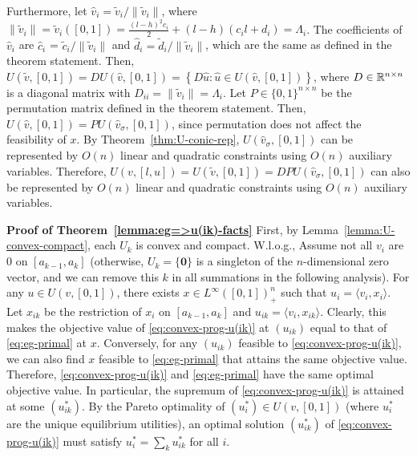 Furthermore, let $\hat{v}_i = \tilde{v}_i/\|\tilde{v}_i\|$, where $\|\tilde{v}_i\| = \tilde{v}_i([0,1]) =\frac{(l-h)^2c_i}{2} + (l-h)(c_i l + d_i) = \Lambda_i$. 
The coefficients of $\hat{v}_i$ are $\hat{c}_i$ = $\tilde{c}_i / \|\tilde{v}_i\|$ and $\hat{d}_i = \tilde{d}_i / \|\tilde{v}_i \|$, which are the same as defined in the theorem statement. Then,
$U(\tilde{v}, [0,1]) = D U(\hat{v},[0,1]) = \left\{D\hat{u}: \hat{u} \in U(\hat{v}, [0,1]) \right\}$,
where $D \in \mathbb{R}^{n\times n}$ is a diagonal matrix with $D_{ii} = \|\tilde{v}_i\| = \Lambda_i$. 
Let $P\in \{0,1\}^{n\times n}$ be the permutation matrix defined in the theorem statement. Then, 
$U(\hat{v}, [0,1]) = PU(\hat{v}_\sigma, [0,1])$,
since permutation does not affect the feasibility of $x$. By Theorem~\ref{thm:U-conic-rep}, $U(\hat{v}_\sigma, [0,1])$ can be represented by $O(n)$ linear and quadratic constraints using $O(n)$ auxiliary variables.
Therefore, 
$U(v, [l,u]) = U(\tilde{v}, [0,1]) = D P U(\hat{v}_\sigma, [0,1])$
can also be represented by $O(n)$ linear and quadratic constraints using $O(n)$ auxiliary variables. 

\smallskip\noindent\textbf{Proof of Theorem~\ref{lemma:eg=>u(ik)-facts}}
First, by Lemma~\ref{lemma:U-convex-compact}, each $U_k$ is convex and compact. W.l.o.g., Assume not all $v_i$ are $0$ on $[a_{k-1}, a_k]$ (otherwise, $U_k = \{\mathbf{0}\}$ is a singleton of the $n$-dimensional zero vector, and we can remove this $k$ in all summations in the following analysis).
For any $u\in U(v, [0,1])$, there exists $x\in L^\infty([0,1])_+^n$ such that $u_i = \langle v_i, x_i\rangle$.  Let $x_{ik}$ be the restriction of $x_i$ on $[a_{k-1}, a_k]$ and $u_{ik} = \langle v_i, x_{ik}\rangle$. 
Clearly, this makes the objective value of \eqref{eq:convex-prog-u(ik)} at $(u_{ik})$ equal to that of \eqref{eq:eg-primal} at $x$. Conversely, for any $(u_{ik})$ feasible to \eqref{eq:convex-prog-u(ik)}, we can also find $x$ feasible to \eqref{eq:eg-primal} that attains the same objective value. Therefore, \eqref{eq:convex-prog-u(ik)} and \eqref{eq:eg-primal} have the same optimal objective value. 
In particular, the supremum of \eqref{eq:convex-prog-u(ik)} is attained at some $(u^*_{ik})$. 
By the Pareto optimality of $(u^*_i) \in U(v, [0,1])$ (where $u^*_i$ are the unique equilibrium utilities), an optimal solution $(u^*_{ik})$ of \eqref{eq:convex-prog-u(ik)} must satisfy $u^*_i = \sum_k u^*_{ik}$ for all $i$.

